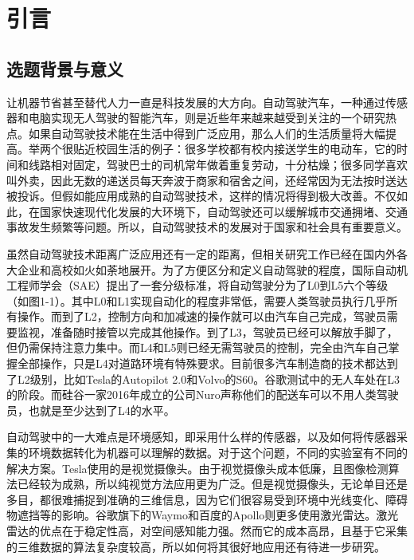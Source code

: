 
\chapter{引言}
\label{cha:introduction}
\section{选题背景与意义}
\label{sec:background}
让机器节省甚至替代人力一直是科技发展的大方向。自动驾驶汽车，一种通过传感器和电脑实现无人驾驶的智能汽车，则是近些年来越来越受到关注的一个研究热点。如果自动驾驶技术能在生活中得到广泛应用，那么人们的生活质量将大幅提高。举两个很贴近校园生活的例子：很多学校都有校内接送学生的电动车，它的时间和线路相对固定，驾驶巴士的司机常年做着重复劳动，十分枯燥；很多同学喜欢叫外卖，因此无数的递送员每天奔波于商家和宿舍之间，还经常因为无法按时送达被投诉。但假如能应用成熟的自动驾驶技术，这样的情况将得到极大改善。不仅如此，在国家快速现代化发展的大环境下，自动驾驶还可以缓解城市交通拥堵、交通事故发生频繁等问题。所以，自动驾驶技术的发展对于国家和社会具有重要意义。

虽然自动驾驶技术距离广泛应用还有一定的距离，但相关研究工作已经在国内外各大企业和高校如火如荼地展开。为了方便区分和定义自动驾驶的程度，国际自动机工程师学会（SAE）提出了一套分级标准，将自动驾驶分为了L0到L5六个等级（如图1-1）。其中L0和L1实现自动化的程度非常低，需要人类驾驶员执行几乎所有操作。而到了L2，控制方向和加减速的操作就可以由汽车自己完成，驾驶员需要监视，准备随时接管以完成其他操作。到了L3，驾驶员已经可以解放手脚了，但仍需保持注意力集中。而L4和L5则已经无需驾驶员的控制，完全由汽车自己掌握全部操作，只是L4对道路环境有特殊要求。目前很多汽车制造商的技术都达到了L2级别，比如Tesla的Autopilot 2.0和Volvo的S60。谷歌测试中的无人车处在L3的阶段。而硅谷一家2016年成立的公司Nuro声称他们的配送车可以不用人类驾驶员，也就是至少达到了L4的水平。


自动驾驶中的一大难点是环境感知，即采用什么样的传感器，以及如何将传感器采集的环境数据转化为机器可以理解的数据。对于这个问题，不同的实验室有不同的解决方案。Tesla使用的是视觉摄像头。由于视觉摄像头成本低廉，且图像检测算法已经较为成熟，所以纯视觉方法应用更为广泛。但是视觉摄像头，无论单目还是多目，都很难捕捉到准确的三维信息，因为它们很容易受到环境中光线变化、障碍物遮挡等的影响。谷歌旗下的Waymo和百度的Apollo则更多使用激光雷达。激光雷达的优点在于稳定性高，对空间感知能力强。然而它的成本高昂，且基于它采集的三维数据的算法复杂度较高，所以如何将其很好地应用还有待进一步研究。

